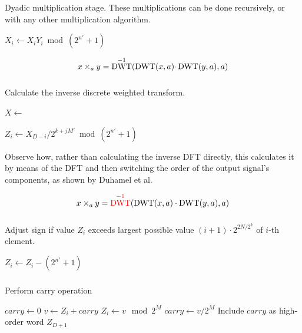 \documentclass{beamer}
\DeclareMathOperator{\DWT}{DWT}
\begin{document}
\begin{frame}
		\frametitle{\secname}
		\framesubtitle{\subsecname}

		Dyadic multiplication stage. These multiplications can be done
		recursively, or with any other multiplication algorithm.

		\begin{algorithmic}[1]
				\State $X_i \gets X_i Y_i \bmod(2^{n'} + 1)$
				\EndFor
		\end{algorithmic}

		\[
				x \times_a y = \DWT^{-1}(\DWT(x, a) {\color{red}\cdot} \DWT(y, a), a)
		\]
\end{frame}

\begin{frame}
		\frametitle{\secname}
		\framesubtitle{\subsecname}

		Calculate the inverse discrete weighted transform.

		\begin{algorithmic}[1]
				\State $X \gets$ 

				\State $Z_i \gets X_{D - i} / 2^{k + jM'} \bmod (2^{n'} + 1)$
		\end{algorithmic}

		Observe how, rather than calculating the inverse DFT directly, this
		calculates it by means of the DFT and then switching the order of the
		output signal's components, as shown by Duhamel et
		al\autocite{duhamelComputingInverseDFT1988}.

		\[
				x \times_a y = {\color{red}\DWT^{-1}}(\DWT(x, a) \cdot \DWT(y, a), a)
		\]
\end{frame}

\begin{frame}
		\frametitle{\secname}
		\framesubtitle{\subsecname}

		Adjust sign if value $Z_i$ exceeds largest possible value $(i + 1)
		\cdot 2^{2N / 2^k}$ of $i$-th element.

		\begin{algorithmic}[1]
				\State $Z_i \gets Z_i - (2^{n'} + 1)$
				\EndIf
				\EndFor
		\end{algorithmic}
\end{frame}

\begin{frame}
		\frametitle{\secname}
		\framesubtitle{\subsecname}

		Perform carry operation

		\begin{algorithmic}[1]
				\State $carry \gets 0$
				  \State $v \gets Z_i + carry$
				  \State $Z_i \gets v \mod 2^M$
				  \State $carry \gets v / 2^M$ 
				\EndFor
				\State Include $carry$ as high-order word $Z_{D+1}$
				\EndIf
		\end{algorithmic}
\end{frame}
\end{document}
